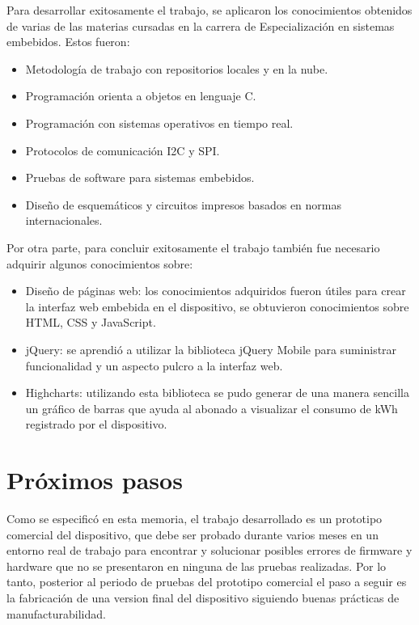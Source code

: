 Para desarrollar exitosamente el trabajo, se aplicaron los conocimientos obtenidos de varias de las materias cursadas en la carrera de Especialización en sistemas embebidos. Estos fueron:

\begin{itemize}
	\item Metodología de trabajo con repositorios locales y en la nube.
	\item Programación orienta a objetos en lenguaje C.
	\item Programación con sistemas operativos en tiempo real.
	\item Protocolos de comunicación I2C y SPI.
	\item Pruebas de software para sistemas embebidos.
	\item Diseño de esquemáticos y circuitos impresos basados en normas internacionales.
\end{itemize}

Por otra parte, para concluir exitosamente el trabajo también fue necesario adquirir algunos conocimientos sobre:

\begin{itemize}
	\item Diseño de páginas web: los conocimientos adquiridos fueron útiles para crear la interfaz web embebida en el dispositivo, se obtuvieron conocimientos sobre HTML, CSS y JavaScript.
	\item jQuery: se aprendió a utilizar la biblioteca jQuery Mobile para suministrar funcionalidad y un aspecto pulcro a la interfaz web.
	\item Highcharts: utilizando esta biblioteca se pudo generar de una manera sencilla un gráfico de barras que ayuda al abonado a visualizar el consumo de kWh registrado por el dispositivo.
\end{itemize}

\section{Próximos pasos}

Como se especificó en esta memoria, el trabajo desarrollado es un prototipo comercial del dispositivo, que debe ser probado durante varios meses en un entorno real de trabajo para encontrar y solucionar posibles errores de firmware y hardware que no se presentaron en ninguna de las pruebas realizadas. Por lo tanto, posterior al periodo de pruebas del prototipo comercial el paso a seguir es la fabricación de una version final del dispositivo siguiendo buenas prácticas de manufacturabilidad.

